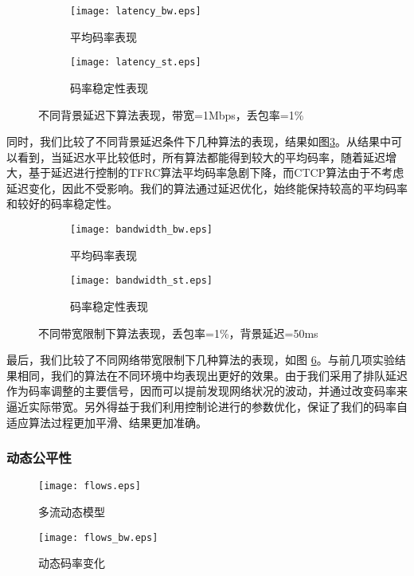         \begin{figure}[htbp]
          \begin{subfigure}[b]{0.5\textwidth}
            \centering
            \texttt{[image: latency\_bw.eps]}
            \caption{平均码率表现}
            \label{pic:latency_bw}
          \end{subfigure}
          \begin{subfigure}[b]{0.5\textwidth}
            \centering
            \texttt{[image: latency\_st.eps]}
            \caption{码率稳定性表现}
            \label{pic:latency_st}
          \end{subfigure}
          \caption{不同背景延迟下算法表现，带宽=1Mbps，丢包率=1\%}
          \label{pic:latency}
        \end{figure}

        同时，我们比较了不同背景延迟条件下几种算法的表现，结果如图\ref{pic:latency}。从结果中可以看到，当延迟水平比较低时，所有算法都能得到较大的平均码率，随着延迟增大，基于延迟进行控制的TFRC算法平均码率急剧下降，而CTCP算法由于不考虑延迟变化，因此不受影响。我们的算法通过延迟优化，始终能保持较高的平均码率和较好的码率稳定性。

        \begin{figure}[htbp]
          \begin{subfigure}[b]{0.5\textwidth}
            \centering
            \texttt{[image: bandwidth\_bw.eps]}
            \caption{平均码率表现}
            \label{pic:bandwidth_bw}
          \end{subfigure}
          \begin{subfigure}[b]{0.5\textwidth}
            \centering
            \texttt{[image: bandwidth\_st.eps]}
            \caption{码率稳定性表现}
            \label{pic:bandwidth_st}
          \end{subfigure}
          \caption{不同带宽限制下算法表现，丢包率=1\%，背景延迟=50ms}
          \label{pic:bandwidth}
        \end{figure}
    
        最后，我们比较了不同网络带宽限制下几种算法的表现，如图 \ref{pic:bandwidth}。与前几项实验结果相同，我们的算法在不同环境中均表现出更好的效果。由于我们采用了排队延迟作为码率调整的主要信号，因而可以提前发现网络状况的波动，并通过改变码率来逼近实际带宽。另外得益于我们利用控制论进行的参数优化，保证了我们的码率自适应算法过程更加平滑、结果更加准确。

        \subsubsection{动态公平性}
        \begin{figure}[htbp]
          \centering
          \texttt{[image: flows.eps]}
          \caption{多流动态模型}
          \label{pic:flows}
        \end{figure}
        \begin{figure}[htbp]
          \centering
          \texttt{[image: flows\_bw.eps]}
          \caption{动态码率变化}
          \label{pic:flows_bw}
        \end{figure}

